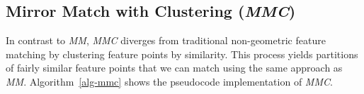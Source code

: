 \documentclass[conference]{IEEEtran}
\begin{document}
\subsection{Mirror Match with Clustering (\emph{MMC})}
%
In contrast to \emph{MM}, \emph{MMC} diverges from traditional 
non-geometric feature matching by clustering feature points by 
similarity. This process yields partitions of fairly similar feature 
points that we can match using the same approach as \emph{MM}.  
Algorithm~\ref{alg-mmc} shows the pseudocode implementation of \emph{MMC}.
%
%
%
%
\end{document}
